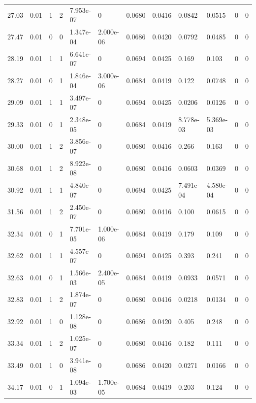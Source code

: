 \documentclass[preview]{standalone}
\begin{document}
{{{\begin{tabular}{L{1.2cm}C{1.2cm} C{0.3cm}C{0.5cm} C{1.4cm}C{1.4cm} C{1.4cm}C{1.4cm} C{1.6cm}C{1.6cm} C{1.6cm}C{1.6cm}}
  27.03  &  0.01  & 1     &  2 &  7.953e-07  & 0  &  0.0680&   0.0416& 0.0842 & 0.0515   &  0 & 0  \\ 
  27.47  &  0.01  & 0     &  0 &  1.347e-04  & 2.000e-06  &  0.0686&   0.0420& 0.0792 & 0.0485   &  0 & 0  \\ 
  28.19  &  0.01  & 1     &  1 &  6.641e-07  & 0  &  0.0694&   0.0425& 0.169 & 0.103   &  0 & 0  \\ 
  28.27  &  0.01  & 0     &  1 &  1.846e-04  & 3.000e-06  &  0.0684&   0.0419& 0.122 & 0.0748   &  0 & 0  \\ 
  29.09  &  0.01  & 1     &  1 &  3.497e-07  & 0  &  0.0694&   0.0425& 0.0206 & 0.0126   &  0 & 0  \\ 
  29.33  &  0.01  & 0     &  1 &  2.348e-05  & 0  &  0.0684&   0.0419& 8.778e-03 & 5.369e-03   &  0 & 0  \\ 
  30.00  &  0.01  & 1     &  2 &  3.856e-07  & 0  &  0.0680&   0.0416& 0.266 & 0.163   &  0 & 0  \\ 
  30.68  &  0.01  & 1     &  2 &  8.922e-08  & 0  &  0.0680&   0.0416& 0.0603 & 0.0369   &  0 & 0  \\ 
  30.92  &  0.01  & 1     &  1 &  4.840e-07  & 0  &  0.0694&   0.0425& 7.491e-04 & 4.580e-04   &  0 & 0  \\ 
  31.56  &  0.01  & 1     &  2 &  2.450e-07  & 0  &  0.0680&   0.0416& 0.100 & 0.0615   &  0 & 0  \\ 
  32.34  &  0.01  & 0     &  1 &  7.701e-05  & 1.000e-06  &  0.0684&   0.0419& 0.179 & 0.109   &  0 & 0  \\ 
  32.62  &  0.01  & 1     &  1 &  4.557e-07  & 0  &  0.0694&   0.0425& 0.393 & 0.241   &  0 & 0  \\ 
  32.63  &  0.01  & 0     &  1 &  1.566e-03  & 2.400e-05  &  0.0684&   0.0419& 0.0933 & 0.0571   &  0 & 0  \\ 
  32.83  &  0.01  & 1     &  2 &  1.874e-07  & 0  &  0.0680&   0.0416& 0.0218 & 0.0134   &  0 & 0  \\ 
  32.92  &  0.01  & 1     &  0 &  1.128e-08  & 0  &  0.0686&   0.0420& 0.405 & 0.248   &  0 & 0  \\ 
  33.34  &  0.01  & 1     &  2 &  1.025e-07  & 0  &  0.0680&   0.0416& 0.182 & 0.111   &  0 & 0  \\ 
  33.49  &  0.01  & 1     &  0 &  3.941e-08  & 0  &  0.0686&   0.0420& 0.0271 & 0.0166   &  0 & 0  \\ 
  34.17  &  0.01  & 0     &  1 &  1.094e-03  & 1.700e-05  &  0.0684&   0.0419& 0.203 & 0.124   &  0 & 0  \\ 

\end{tabular}}}}
\end{document}
